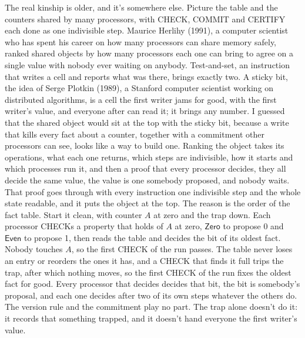 \documentclass[11pt,twoside]{article}
\theoremstyle{thielethm}
\theoremstyle{thieledef}
\theoremstyle{thieledef}
\theoremstyle{thieledef}
\theoremstyle{thielethm}
\theoremstyle{thieleobs}
\theoremstyle{thielethm}
\begin{document}
The real kinship is older, and it's somewhere else. Picture the table and the counters shared
by many processors, with CHECK, COMMIT and CERTIFY each done as one indivisible step. Maurice
Herlihy (1991), a computer scientist who has spent his career on how many processors can share
memory safely, ranked shared objects by how many processors each one can bring to agree on a
single value with nobody ever waiting on anybody. Test-and-set, an instruction that writes a
cell and reports what was there, brings exactly two. A sticky bit, the idea of Serge
Plotkin (1989), a Stanford computer scientist working on distributed algorithms, is a cell the
first writer jams for good, with the first writer's value, and everyone after can read it; it
brings any number. I guessed that the shared object would sit at the top with the sticky bit,
because a write that kills every fact about a counter, together with a commitment other
processors can see, looks like a way to build one. Ranking the object takes its operations, what
each one returns, which steps are indivisible, how it starts and which processes run it, and then
a proof that every processor decides, they all decide the same value, the value is one somebody
proposed, and nobody waits. That proof goes through with every instruction one indivisible step and the whole
state readable, and it puts the object at the top. The reason is the order of the fact table. Start
it clean, with counter $A$ at zero and the trap down. Each
processor CHECKs a property that holds of $A$ at zero, $\mathsf{Zero}$ to propose 0 and $\mathsf{Even}$ to
propose 1, then reads the table and decides the bit of its oldest fact. Nobody touches $A$, so
the first CHECK of the run passes. The table never loses an entry or reorders the ones it has,
and a CHECK that finds it full trips the trap, after which nothing moves, so
the first CHECK of the run fixes the oldest fact for good. Every processor that decides decides
that bit, the bit is somebody's proposal, and each one decides after two of its own steps
whatever the others do. The version rule and the commitment play no part. The trap alone doesn't do
it: it records that something trapped, and it doesn't hand everyone the first writer's value.
\end{document}
